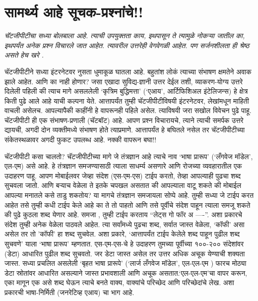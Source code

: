\chapter{सामर्थ्य आहे सूचक-प्रश्नांचे!!}

{\textit{चॅटजीपीटीचा सध्या बोलबाला आहे.  त्याची उपयुक्तता काय,  इथपासून ते त्यामुळे नोकऱ्या जातील का,  इथपर्यंत अनेक प्रश्न विचारले जात आहेत.  त्यावरील उत्तरेही वेगवेगळी आहेत.  पण सर्जनशीलता ही श्रेष्ठ असते हेच खरे .  }}

\vspace{1.5em}

चॅटजीपीटीने सध्या इंटरनेटवर नुसता धुमाकूळ घातला आहे. बहुतांश लोकं त्याच्या संभाषण क्षमतेने अवाक झाले आहेत. आणि का नाही होणार? जसा एखादा सुविद्य-ज्ञानी उत्तर देईल तशी, व्याकरण-योग्य उत्तरे दिलेली पहिली की त्याच मागे असललेली `कृत्रिम बुद्धिमत्ता' (`एआय', आर्टिफिशिअल इंटेलिजन्स) हे क्षेत्र किती पुढे आले आहे याची कल्पना येते. आत्तापर्यंत तुम्ही चॅटजीपीटीविषयी इंटरनेटवर, लेखांमधून माहिती वाचली असेलच. आपल्यापैकी काहींनी हे वापरूनही पहिले असेल. त्याविषयी जरा सखोल विवेचन पुढे पाहू. चॅटजीपीटी ही एक संभाषण-प्रणाली (चॅटबॉट) आहे. आपण प्रश्न विचारायचे, त्याने त्याची समर्पक उत्तरे द्यायची, अगदी दोन व्यक्तीमध्ये संभाषण होते त्याप्रमाणे. आत्तापर्यंत हे बघितले नसेल तर चॅटजीपीटीच्या संकेतस्थळावर अगदी फुकट उपलब्ध आहे. नक्की वापरून बघा!!

चॅटजीपीटी कसा चालतो?
चॅटजीपीटीच्या मागे जे तंत्रज्ञान आहे त्याचे नाव `भाषा प्रारूप' (`लँगवेज मॉडेल', एल-एम) असे आहे. हे तंत्रज्ञान समजण्यासाठी त्याला साधर्म्य असणारे आणि रोजच्या व्यवहारातील एक उदाहरण पाहू. आपण मोबाईलवर जेव्हा संदेश (एस-एम-एस) टाईप करतो, तेव्हा आपल्याही पुढचा शब्द सुचवला जातो. आणि बऱ्याच वेळेला ते इतके चपखल असतात की आपल्याला वाटू शकते की मोबाईल आपल्या मनातले कसे ताडु शकतोय? या मागचे तंत्रज्ञान समजायला सोप्पे आहे. तुम्ही सध्या जे टाईप करत आहेत तसे तुम्ही कधी टाईप केले आहे का ते तो पाहतो आणि तसे पूर्वीचे संदेश पाहून त्याला समजू शकते की पुढे कुठला शब्द येणार आहे. समजा , तुम्ही टाईप करताय ``लेट्स गो फॉर अ ----''. अशा प्रकारचे संदेश तुम्ही अनेक वेळेला पाठवले आहेत. त्या सर्वांमध्ये पुढचा शब्द, सर्वात जास्त वेळेला, `कॉफी' असा असेल तर तो 'कॉफी' हा शब्द सुचवेल. अशा प्रकारे, `आत्तापर्यंत टाईप केलेले शब्द पाहून पुढील शब्द सुचवणे' याला `भाषा प्रारूप' म्हणतात. एस-एम-एस-चे हे उदाहरण तुमच्या पूर्वीच्या १००-२०० संदेशांवर (डेटा) आधारित पुढील शब्द सुचवतो. जर डेटा जास्त असेल तर उत्तर अधिक अचूक येण्याची शक्यता जास्त. सध्या प्रचलित असलेली `बृहत भाषा प्रारूपे' (`लार्ज लँगवेज मॉडेल', एल-एल-एम ) फारच मोठ्या डेटा स्रोतांवर आधारित असल्याने जास्त प्रभावशाली आणि अचूक असतात.`एल-एल-एम'चा वापर करून, एका मागून एक असे शब्द घेऊन त्याचे बनते वाक्य, वाक्यांचे परिच्छेद आणि परिच्छेदांचे लेख. अशा प्रकारची भाषा-निर्मिती (जनरेटिव्ह एआय) चा भाग आहे.

